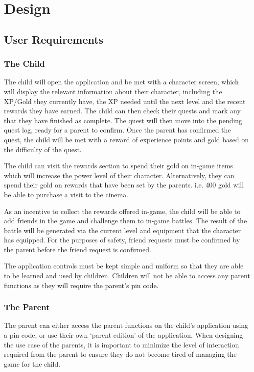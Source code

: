 \chapter{Design}

\section{User Requirements}
\subsection{The Child}
The child will open the application and be met with a character screen, which will display the relevant information about their character, including the XP/Gold they currently have, the XP needed until the next level and the recent rewards they have earned.
The child can then check their quests and mark any that they have finished as complete.
The quest will then move into the pending quest log, ready for a parent to confirm.
Once the parent has confirmed the quest, the child will be met with a reward of experience points and gold based on the difficulty of the quest.

The child can visit the rewards section to spend their gold on in-game items which will increase the power level of their character. 
Alternatively, they can spend their gold on rewards that have been set by the parents. 
i.e. 400 gold will be able to purchase a visit to the cinema.

As an incentive to collect the rewards offered in-game, the child will be able to add friends in the game and challenge them to in-game battles. 
The result of the battle will be generated via the current level and equipment that the character has equipped. 
For the purposes of safety, friend requests must be confirmed by the parent before the friend request is confirmed.

The application controls must be kept simple and uniform so that they are able to be learned and used by children.
Children will not be able to access any parent functions as they will require the parent's pin code. 

\subsection{The Parent}
The parent can either access the parent functions on the child's application using a pin code, or use their own `parent edition' of the application. 
When designing the use case of the parents, it is important to minimize the level of interaction required from the parent to ensure they do not become tired of managing the game for the child.

